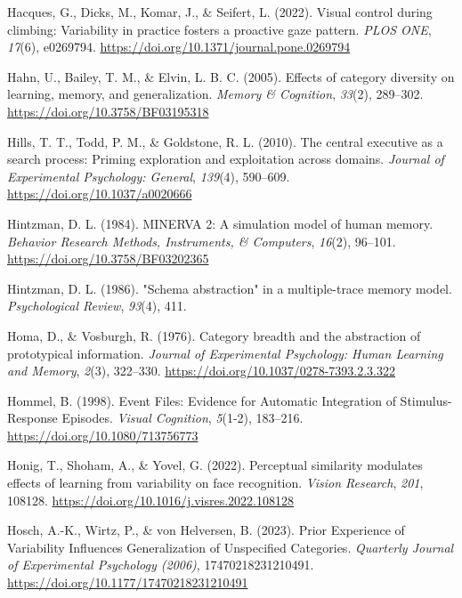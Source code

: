 \documentclass[
  11pt,
  letterpaper,
]{article}
\newlength{\cslhangindent}
\newenvironment{CSLReferences}[2] %
 {\begin{list}{}{%
  \setlength{\itemindent}{0pt}
  \setlength{\leftmargin}{0pt}
  \setlength{\parsep}{0pt}
  \ifodd #1
   \setlength{\leftmargin}{\cslhangindent}
   \setlength{\itemindent}{-1\cslhangindent}
  \fi
  \setlength{\itemsep}{#2\baselineskip}}}
 {\end{list}}
\begin{document}
\begin{CSLReferences}{1}{0}
Hacques, G., Dicks, M., Komar, J., \& Seifert, L. (2022). Visual control
during climbing: {Variability} in practice fosters a proactive gaze
pattern. \emph{PLOS ONE}, \emph{17}(6), e0269794.
\url{https://doi.org/10.1371/journal.pone.0269794}

Hahn, U., Bailey, T. M., \& Elvin, L. B. C. (2005). Effects of category
diversity on learning, memory, and generalization. \emph{Memory \&
Cognition}, \emph{33}(2), 289--302.
\url{https://doi.org/10.3758/BF03195318}

Hills, T. T., Todd, P. M., \& Goldstone, R. L. (2010). The central
executive as a search process: {Priming} exploration and exploitation
across domains. \emph{Journal of Experimental Psychology: General},
\emph{139}(4), 590--609. \url{https://doi.org/10.1037/a0020666}

Hintzman, D. L. (1984). {MINERVA} 2: {A} simulation model of human
memory. \emph{Behavior Research Methods, Instruments, \& Computers},
\emph{16}(2), 96--101. \url{https://doi.org/10.3758/BF03202365}

Hintzman, D. L. (1986). "{Schema} abstraction" in a multiple-trace
memory model. \emph{Psychological Review}, \emph{93}(4), 411.

Homa, D., \& Vosburgh, R. (1976). Category breadth and the abstraction
of prototypical information. \emph{Journal of Experimental Psychology:
Human Learning and Memory}, \emph{2}(3), 322--330.
\url{https://doi.org/10.1037/0278-7393.2.3.322}

Hommel, B. (1998). Event {Files}: {Evidence} for {Automatic Integration}
of {Stimulus-Response Episodes}. \emph{Visual Cognition}, \emph{5}(1-2),
183--216. \url{https://doi.org/10.1080/713756773}

Honig, T., Shoham, A., \& Yovel, G. (2022). Perceptual similarity
modulates effects of learning from variability on face recognition.
\emph{Vision Research}, \emph{201}, 108128.
\url{https://doi.org/10.1016/j.visres.2022.108128}

Hosch, A.-K., Wirtz, P., \& von Helversen, B. (2023). Prior {Experience}
of {Variability Influences Generalization} of {Unspecified Categories}.
\emph{Quarterly Journal of Experimental Psychology (2006)},
17470218231210491. \url{https://doi.org/10.1177/17470218231210491}


\end{CSLReferences}
\end{document}
